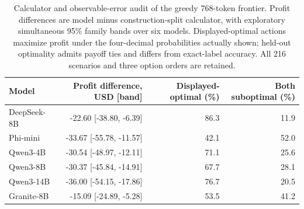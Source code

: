 \begin{table}[htbp]
\centering\small
\caption{Calculator and observable-error audit of the greedy 768-token frontier. Profit differences are model minus construction-split calculator, with exploratory simultaneous 95\% family bands over six models. Displayed-optimal actions maximize profit under the four-decimal probabilities actually shown; held-out optimality admits payoff ties and differs from exact-label accuracy. All 216 scenarios and three option orders are retained.}
\label{tab:calculatorerroraudit}
\setlength{\tabcolsep}{4pt}
\begin{tabular}{lrrr}
\toprule
Model & Profit difference, USD [band] & Displayed-optimal (\%) & Both suboptimal (\%) \\
\midrule
DeepSeek-8B & -22.60 [-38.80, -6.39] & 86.3 & 11.9 \\
Phi-mini & -33.67 [-55.78, -11.57] & 42.1 & 52.0 \\
Qwen3-4B & -30.54 [-48.97, -12.11] & 71.1 & 25.6 \\
Qwen3-8B & -30.37 [-45.84, -14.91] & 67.7 & 28.1 \\
Qwen3-14B & -36.00 [-54.15, -17.86] & 76.7 & 20.5 \\
Granite-8B & -15.09 [-24.89, -5.28] & 53.5 & 41.2 \\
\bottomrule
\end{tabular}
\end{table}
